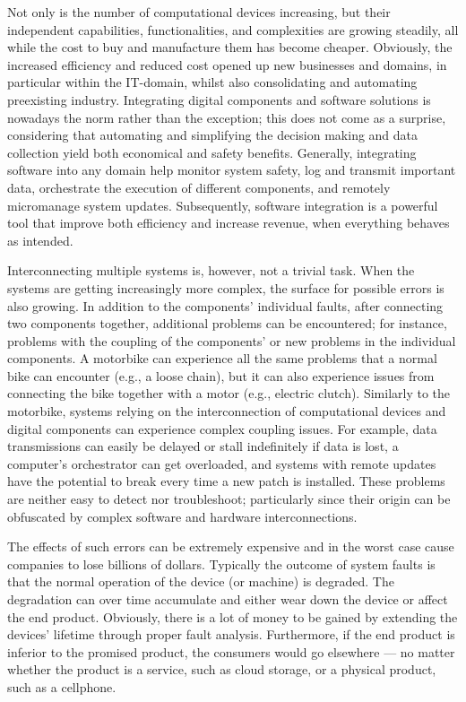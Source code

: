 Not only is the number of computational devices increasing, but their independent capabilities, functionalities, and complexities are growing steadily, all while the cost to buy and manufacture them has become cheaper.
Obviously, the increased efficiency and reduced cost opened up new businesses and domains, in particular within the IT-domain, whilst also consolidating and automating preexisting industry.
Integrating digital components and software solutions is nowadays the norm rather than the exception; this does not come as a surprise, considering that automating and simplifying the decision making and data collection yield both economical and safety benefits.
Generally, integrating software into any domain help monitor system safety, log and transmit important data, orchestrate the execution of different components, and remotely micromanage system updates.
Subsequently, software integration is a powerful tool that improve both efficiency and increase revenue, when everything behaves as intended.

Interconnecting multiple systems is, however, not a trivial task.
When the systems are getting increasingly more complex, the surface for possible errors is also growing.
In addition to the components' individual faults, after connecting two components together, additional problems can be encountered; for instance, problems with the coupling of the components' or new problems in the individual components.
A motorbike can experience all the same problems that a normal bike can encounter (e.g., a loose chain), but it can also experience issues from connecting the bike together with a motor (e.g., electric clutch).
Similarly to the motorbike, systems relying on the interconnection of computational devices and digital components can experience complex coupling issues.
For example, data transmissions can easily be delayed or stall indefinitely if data is lost, a computer's orchestrator can get overloaded, and systems with remote updates have the potential to break every time a new patch is installed.
These problems are neither easy to detect nor troubleshoot; particularly since their origin can be obfuscated by complex software and hardware interconnections.

The effects of such errors can be extremely expensive and in the worst case cause companies to lose billions of dollars.
Typically the outcome of system faults is that the normal operation of the device (or machine) is degraded.
The degradation can over time accumulate and either wear down the device or affect the end product.
Obviously, there is a lot of money to be gained by extending the devices' lifetime through proper fault analysis.
Furthermore, if the end product is inferior to the promised product, the consumers would go elsewhere --- no matter whether the product is a service, such as cloud storage, or a physical product, such as a cellphone.

